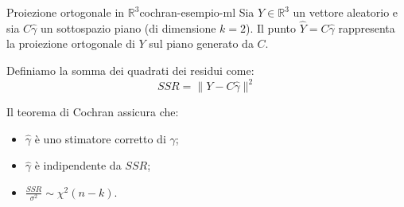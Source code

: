 \begin{esempio}{Proiezione ortogonale in $\mathbb{R}^3$}{cochran-esempio-ml}
Sia $Y \in \mathbb{R}^3$ un vettore aleatorio e sia $C\hat{\gamma}$ un sottospazio
piano (di dimensione $k=2$). Il punto $\hat{Y} = C\hat{\gamma}$ rappresenta la
proiezione ortogonale di $Y$ sul piano generato da $C$.

Definiamo la somma dei quadrati dei residui come:
\[
SSR = \| Y - C\hat{\gamma} \|^2
\]

Il teorema di Cochran assicura che:
\begin{itemize}
  \item $\hat{\gamma}$ è uno stimatore corretto di $\gamma$;
  \item $\hat{\gamma}$ è indipendente da $SSR$;
  \item $\frac{SSR}{\sigma^2} \sim \chi^2(n-k)$.
\end{itemize}
\end{esempio}

